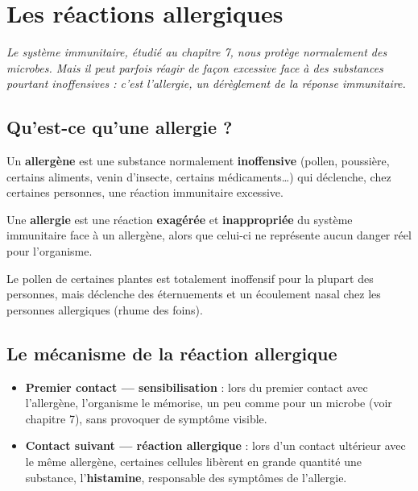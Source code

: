 \chapter{Les réactions allergiques}

\noindent\textit{Le système immunitaire, étudié au chapitre 7, nous protège
normalement des microbes. Mais il peut parfois réagir de façon excessive face à des
substances pourtant inoffensives : c'est l'allergie, un dérèglement de la réponse
immunitaire.}
\vspace{8pt}

\connecteBanner

\section{Qu'est-ce qu'une allergie ?}

\begin{definition}[Allergène]
Un \textbf{allergène} est une substance normalement \textbf{inoffensive} (pollen,
poussière, certains aliments, venin d'insecte, certains médicaments\dots) qui
déclenche, chez certaines personnes, une réaction immunitaire excessive.
\end{definition}

\begin{definition}[Allergie]
Une \textbf{allergie} est une réaction \textbf{exagérée} et \textbf{inappropriée} du
système immunitaire face à un allergène, alors que celui-ci ne représente aucun
danger réel pour l'organisme.
\end{definition}

\begin{exemple}
Le pollen de certaines plantes est totalement inoffensif pour la plupart des
personnes, mais déclenche des éternuements et un écoulement nasal chez les personnes
allergiques (rhume des foins).
\end{exemple}

\section{Le mécanisme de la réaction allergique}

\begin{propriete}
\begin{itemize}
\item \textbf{Premier contact — sensibilisation} : lors du premier contact avec
l'allergène, l'organisme le mémorise, un peu comme pour un microbe (voir chapitre 7),
sans provoquer de symptôme visible.
\item \textbf{Contact suivant — réaction allergique} : lors d'un contact ultérieur
avec le même allergène, certaines cellules libèrent en grande quantité une substance,
l'\textbf{histamine}, responsable des symptômes de l'allergie.
\end{itemize}
\end{propriete}

